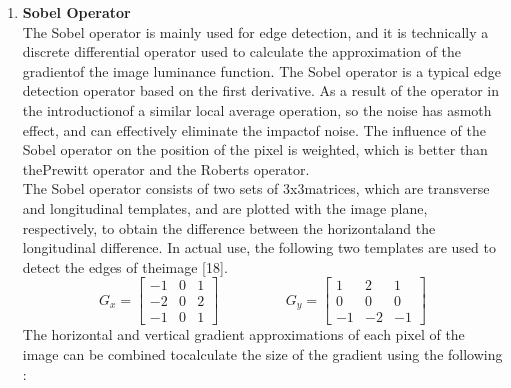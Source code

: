         \begin{enumerate}{}
                \item \textbf{Sobel Operator} \\
                The Sobel operator is mainly used for edge detection, and it is technically a discrete differential
                operator used to calculate the approximation of the gradientof the image luminance function.
                The Sobel operator is a typical edge detection operator based on the first derivative.
                As a result of the operator in the introductionof a similar local average operation,
                so the noise has asmoth effect, and can effectively eliminate the impactof noise.
                The influence of the Sobel operator on the position of the pixel is weighted, which is better
                than thePrewitt operator and the Roberts operator.\\
                The Sobel operator consists of two sets of 3x3matrices, which are transverse and longitudinal templates,
                and are plotted with the image plane, respectively, to obtain the difference between the horizontaland
                the longitudinal difference. In actual use, the following two templates are used to detect the edges of theimage [18].
                        \begin{equation}
                                G_x =
                                \begin{bmatrix}
                                        -1 & 0 & 1 \\
                                        -2 & 0 & 2 \\
                                        -1 & 0 & 1
                                \end{bmatrix}
                                \hspace{2cm}
                                G_y =
                                \begin{bmatrix}
                                        1 & 2 & 1 \\
                                        0 & 0 & 0 \\
                                        -1 & -2 & -1
                                \end{bmatrix}
                        \end{equation}
                The horizontal and vertical gradient approximations of each pixel of the image can be combined
                tocalculate the size of the gradient using the following :

\end{enumerate}
